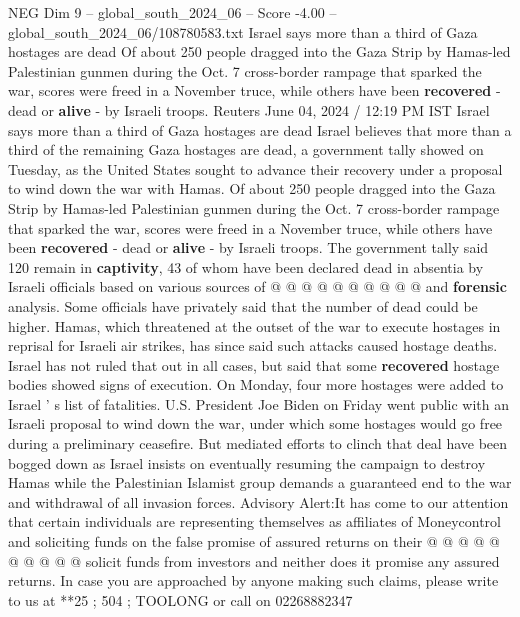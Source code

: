 \begin{textsample}{NEG Dim 9 – global\_south\_2024\_06 – Score -4.00 – global\_south\_2024\_06/108780583.txt}  \label{ex:f9_neg_358}
Israel says more than a third of Gaza hostages are dead Of about 250 people dragged into the Gaza Strip by Hamas-led Palestinian gunmen during the Oct. 7 cross-border rampage that sparked the war, scores were freed in a November truce, while others have been \textbf{recovered} - dead or \textbf{alive} - by Israeli troops.
Reuters June 04, 2024 / 12:19 PM IST Israel says more than a third of Gaza hostages are dead Israel believes that more than a third of the remaining Gaza hostages are dead, a government tally showed on Tuesday, as the United States sought to advance their recovery under a proposal to wind down the war with Hamas.
Of about 250 people dragged into the Gaza Strip by Hamas-led Palestinian gunmen during the Oct. 7 cross-border rampage that sparked the war, scores were freed in a November truce, while others have been \textbf{recovered} - dead or \textbf{alive} - by Israeli troops.
The government tally said 120 remain in \textbf{captivity}, 43 of whom have been declared dead in absentia by Israeli officials based on various sources of @ @ @ @ @ @ @ @ @ @ and \textbf{forensic} analysis.
Some officials have privately said that the number of dead could be higher.
Hamas, which threatened at the outset of the war to execute hostages in reprisal for Israeli air strikes, has since said such attacks caused hostage deaths.
Israel has not ruled that out in all cases, but said that some \textbf{recovered} hostage bodies showed signs of execution.
On Monday, four more hostages were added to Israel ' s list of fatalities.
U.S.
President Joe Biden on Friday went public with an Israeli proposal to wind down the war, under which some hostages would go free during a preliminary ceasefire.
But mediated efforts to clinch that deal have been bogged down as Israel insists on eventually resuming the campaign to destroy Hamas while the Palestinian Islamist group demands a guaranteed end to the war and withdrawal of all invasion forces.
Advisory Alert:It has come to our attention that certain individuals are representing themselves as affiliates of Moneycontrol and soliciting funds on the false promise of assured returns on their @ @ @ @ @ @ @ @ @ @ solicit funds from investors and neither does it promise any assured returns.
In case you are approached by anyone making such claims, please write to us at **25 ; 504 ; TOOLONG or call on 02268882347

\end{textsample}

